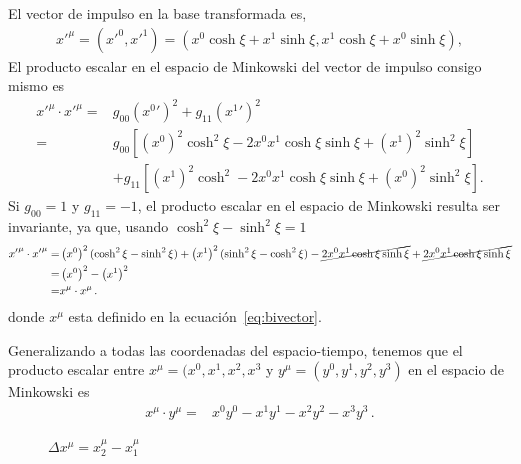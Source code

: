 \documentclass[11pt,a4paper]{book}
\begin{document}
El vector de impulso en la base transformada es, 
\begin{align*}
{x'}^\mu = ({x'}^0,{x'}^1) = ({x^0}\cosh\xi + {x^1}\sinh\xi, {x^1}\cosh\xi +{x^0}\sinh\xi),
\end{align*}
El producto escalar en el espacio de Minkowski del vector de impulso consigo mismo es 
\begin{align*}
    {x'}^\mu \cdot {x'}^\mu =& 
g_{00} \left({x^0}'\right)^2 + g_{11} \left({x^1}'\right)^2 \\
=& g_{00}\left[\left({x^0}\right)^2\cosh^2\xi -2 {x^0}{x^1}\cosh\xi\sinh\xi+\left({x^1}\right)^2\sinh^2\xi\right]\\
&+
g_{11}\left[\left({x^1}\right)^2\cosh^2-2{x^0}{x^1}\cosh\xi\sinh\xi + \left({x^0}\right)^2\sinh^2\xi\right].
\end{align*}
Si $g_{00}=1$ y $g_{11}=-1$, el producto escalar en el espacio de Minkowski resulta ser invariante, ya que, usando $\cosh^2\xi-\sinh^2\xi=1$
\begin{align*}
        {x'}^\mu \cdot {x'}^\mu   
=& \left({x^0}\right)^2(\cosh^2\xi-\sinh^2\xi)+\left({x^1}\right)^2(\sinh^2\xi-\cosh^2\xi) -\cancel{2 {x^0}{x^1}\cosh\xi\sinh\xi}+\cancel{2 {x^0}{x^1}\cosh\xi\sinh\xi}\\
=&\left({x^0}\right)^2 - \left({x^1}\right)^2\\
=&x^\mu\cdot x^\mu\,.
\end{align*}
donde $x^\mu$ esta definido en la ecuación~\eqref{eq:bivector}.




Generalizando a todas las coordenadas del espacio-tiempo, tenemos que el producto escalar entre $x^\mu=(x^0,x^1, x^2, x^3$ y $y^\mu=(y^0,y^1,y^2,y^3)$ en el espacio de Minkowski es
\begin{align}
    x^\mu\cdot y^\mu =& x^0 y^0 -x^1 y^1 -x^2 y^2 -x^3 y^3\,.
\end{align}

\begin{figure}
    \centering
{}
    \caption{$\Delta x^\mu = x^\mu_2 - x^\mu_1$}
    \label{fig:b2-b1}
\end{figure}
\end{document}
